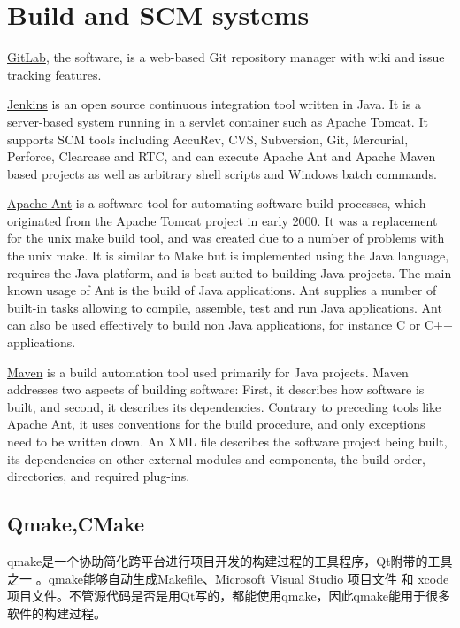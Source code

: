 
\section{Build and SCM systems}

\href{https://about.gitlab.com/}{GitLab}, the software, is a web-based Git repository manager with wiki and issue tracking features.
 
\href{https://jenkins-ci.org/}{Jenkins} is an open source continuous integration tool written in Java.
 It is a server-based system running in a servlet container such as Apache Tomcat. 
 It supports SCM tools including AccuRev, CVS, Subversion, Git, Mercurial, Perforce, Clearcase and RTC, 
 and can execute Apache Ant and Apache Maven based projects as well as arbitrary shell scripts and Windows batch commands.

\href{http://ant.apache.org/}{Apache Ant} is a software tool for automating
software build processes, which originated from the Apache Tomcat project in early 2000.
 It was a replacement for the unix make build tool, and was created due to a number of problems with the unix make.
It is similar to Make but is implemented using the Java language, requires the Java platform, and is best suited to building Java projects.
 The main known usage of Ant is the build of Java applications. 
 Ant supplies a number of built-in tasks allowing to compile, assemble, test and run Java applications. 
Ant can also be used effectively to build non Java applications, for instance C or C++ applications.

\href{https://maven.apache.org/}{Maven} is a build automation tool used primarily for Java projects.
Maven addresses two aspects of building software: First, it describes how
software is built, and second, it describes its dependencies. 
Contrary to preceding tools like Apache Ant, it uses conventions for the build procedure, and only exceptions need to be written down. 
An XML file describes the software project being built, its dependencies on other external modules and components, the build order, directories, and required plug-ins.


\subsection{Qmake,CMake}
qmake是一个协助简化跨平台进行项目开发的构建过程的工具程序，Qt附带的工具之一 。qmake能够自动生成Makefile、Microsoft Visual Studio 项目文件 和 xcode 项目文件。不管源代码是否是用Qt写的，都能使用qmake，因此qmake能用于很多软件的构建过程。

